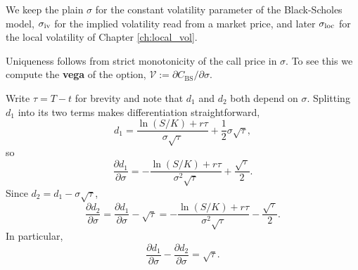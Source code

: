 We keep the plain $\sigma$ for the constant volatility parameter of the Black-Scholes model,
$\sigma_{\mathrm{iv}}$ for the implied volatility read from a market price,
and later $\sigma_{\mathrm{loc}}$ for the local volatility of Chapter \ref{ch:local_vol}.

Uniqueness follows from strict monotonicity of the call price in $\sigma$.
To see this we compute the \textbf{vega} of the option, $\mathcal{V} := \partial C_{\mathrm{BS}} / \partial \sigma$.

Write $\tau = T - t$ for brevity and note that $d_1$ and $d_2$ both depend on $\sigma$.
Splitting $d_1$ into its two terms makes differentiation straightforward,
\begin{equation*}
    d_1 = \frac{\ln(S/K) + r\tau}{\sigma\sqrt{\tau}} + \frac{1}{2}\sigma\sqrt{\tau},
\end{equation*}
so
\begin{equation}\label{eq:dd1_dsigma}
    \frac{\partial d_1}{\partial \sigma}
        = -\frac{\ln(S/K) + r\tau}{\sigma^2\sqrt{\tau}} + \frac{\sqrt{\tau}}{2}.
\end{equation}
Since $d_2 = d_1 - \sigma\sqrt{\tau}$,
\begin{equation}\label{eq:dd2_dsigma}
    \frac{\partial d_2}{\partial \sigma}
        = \frac{\partial d_1}{\partial \sigma} - \sqrt{\tau}
        = -\frac{\ln(S/K) + r\tau}{\sigma^2\sqrt{\tau}} - \frac{\sqrt{\tau}}{2}.
\end{equation}
In particular,
\begin{equation}\label{eq:dd1_minus_dd2}
    \frac{\partial d_1}{\partial \sigma} - \frac{\partial d_2}{\partial \sigma} = \sqrt{\tau}.
\end{equation}

